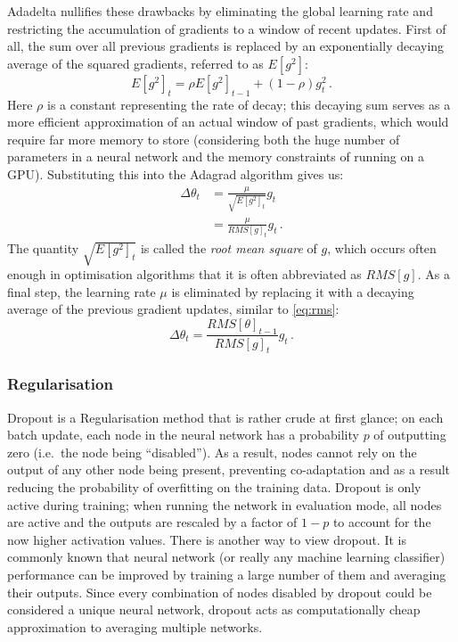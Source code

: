 Adadelta nullifies these drawbacks by eliminating the global learning rate and
restricting the accumulation of gradients to a window of recent updates. First
of all, the sum over all previous gradients is replaced by an exponentially
decaying average of the squared gradients, referred to as $E[g^2]$:
\begin{equation}\label{eq:rms}
  E[g^2]_t = \rho E[g^2]_{t-1} + (1 - \rho) g_t^2\,.
\end{equation}
Here $\rho$ is a constant representing the rate of decay; this decaying sum
serves as a more efficient approximation of an actual window of past gradients,
which would require far more memory to store (considering both the huge number
of parameters in a neural network and the memory constraints of running on a GPU).
Substituting this into the Adagrad algorithm gives us:
\begin{align}
  \Delta\theta_t &= \frac{\mu}{\sqrt{E[g^2]_t}} g_{t} \\
		 &= \frac{\mu}{RMS[g]_t} g_{t}\,.
\end{align}
The quantity $\sqrt{E[g^2]_t}$ is called the \emph{root mean square} of $g$,
which occurs often enough in optimisation algorithms that it is often
abbreviated as $RMS[g]$. As a final step, the learning rate $\mu$ is eliminated
by replacing it with a decaying average of the previous gradient updates,
similar to \cref{eq:rms}:
\begin{equation}
  \Delta\theta_t = \frac{RMS[\theta]_{t-1}}{RMS[g]_t} g_{t}\,.
\end{equation}

\subsubsection{Regularisation}\label{sec:reg}
Dropout\citep{dropout} is a Regularisation method that is rather crude at first
glance; on each batch update, each node in the neural network has a probability
$p$ of outputting zero (i.e.\ the node being ``disabled''). As a result, nodes
cannot rely on the output of any other node being present, preventing
co-adaptation and as a result reducing the probability of overfitting on the
training data. Dropout is only active during training; when running the network
in evaluation mode, all nodes are active and the outputs are rescaled by a
factor of $1 - p$ to account for the now higher activation values.
There is another way to view dropout. It is commonly known that neural network
(or really any machine learning classifier) performance can be improved by
training a large number of them and averaging their outputs. Since every
combination of nodes disabled by dropout could be considered a unique neural
network, dropout acts as computationally cheap approximation to averaging
multiple networks.

